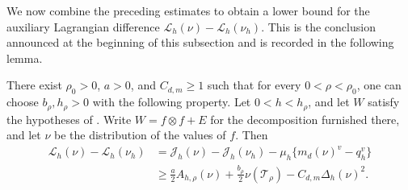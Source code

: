 We now combine the preceding estimates to obtain a lower bound for the
auxiliary Lagrangian difference $\mathcal L_h(\nu)-\mathcal L_h(\nu_h)$.
This is the conclusion announced at the beginning of this subsection and is
recorded in the following lemma.

\begin{lemma}
\label{lem:auxiliary-lagrangian-bound}
There exist $\rho_0>0$, $a>0$, and $C_{d,m}\ge1$ such that
for every $0<\rho<\rho_0$, one can choose $b_\rho,h_\rho>0$ with the following property.
Let $0<h<h_\rho$, and let $W$ satisfy the hypotheses of
.  Write $W=f\otimes f+E$ for the
decomposition furnished there, and let $\nu$ be the distribution of the
values of $f$.  Then
\begin{equation}\label{eq:auxiliary-lagrangian-bound}
\begin{aligned}
  \mathcal L_h(\nu)-\mathcal L_h(\nu_h)
  &=\mathcal J_h(\nu)-\mathcal J_h(\nu_h)
    -\mu_h\{m_d(\nu)^v-q_h^v\}\\
  &\ge \frac{a}{2} A_{h,\rho}(\nu)
    +\frac{b_\rho}{2} \nu(\mathcal T_\rho)
    -C_{d,m}\Delta_h(\nu)^2.
\end{aligned}
\end{equation}
\end{lemma}

